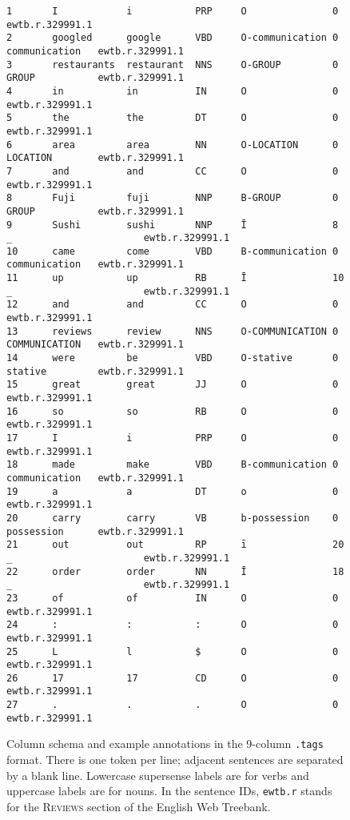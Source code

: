 \documentclass[11pt]{article}
\begin{document}
\begin{figure*}
\begin{verbatim}
1       I            i           PRP     O               0                               ewtb.r.329991.1
2       googled      google      VBD     O-communication 0               communication   ewtb.r.329991.1
3       restaurants  restaurant  NNS     O-GROUP         0               GROUP           ewtb.r.329991.1
4       in           in          IN      O               0                               ewtb.r.329991.1
5       the          the         DT      O               0                               ewtb.r.329991.1
6       area         area        NN      O-LOCATION      0               LOCATION        ewtb.r.329991.1
7       and          and         CC      O               0                               ewtb.r.329991.1
8       Fuji         fuji        NNP     B-GROUP         0               GROUP           ewtb.r.329991.1
9       Sushi        sushi       NNP     Ī               8       _                       ewtb.r.329991.1
10      came         come        VBD     B-communication 0               communication   ewtb.r.329991.1
11      up           up          RB      Ī               10      _                       ewtb.r.329991.1
12      and          and         CC      O               0                               ewtb.r.329991.1
13      reviews      review      NNS     O-COMMUNICATION 0               COMMUNICATION   ewtb.r.329991.1
14      were         be          VBD     O-stative       0               stative         ewtb.r.329991.1
15      great        great       JJ      O               0                               ewtb.r.329991.1
16      so           so          RB      O               0                               ewtb.r.329991.1
17      I            i           PRP     O               0                               ewtb.r.329991.1
18      made         make        VBD     B-communication 0               communication   ewtb.r.329991.1
19      a            a           DT      o               0                               ewtb.r.329991.1
20      carry        carry       VB      b-possession    0               possession      ewtb.r.329991.1
21      out          out         RP      ī               20      _                       ewtb.r.329991.1
22      order        order       NN      Ī               18      _                       ewtb.r.329991.1
23      of           of          IN      O               0                               ewtb.r.329991.1
24      :            :           :       O               0                               ewtb.r.329991.1
25      L            l           $       O               0                               ewtb.r.329991.1
26      17           17          CD      O               0                               ewtb.r.329991.1
27      .            .           .       O               0                               ewtb.r.329991.1
\end{verbatim}
\caption{Column schema and example annotations in the 9-column \texttt{.tags} format.
There is one token per line; adjacent sentences are separated by a blank line.
Lowercase supersense labels are for verbs and uppercase labels are for nouns.
In the sentence IDs, \texttt{ewtb.r} stands for the \textsc{Reviews} section of the English Web Treebank.}
\label{fig:tagsformat}
\end{figure*}


\setlength{\bibsep}{10pt}
{\fontsize{10}{12.25}\selectfont
}
\end{document}
